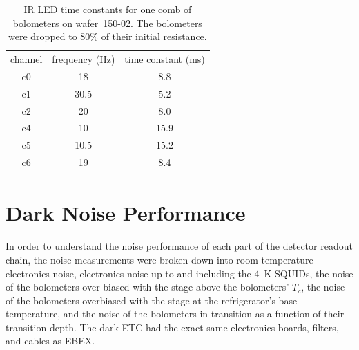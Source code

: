 \begin{table}[htp]
\begin{center}
\begin{tabular}{|c|c|c|}
channel & frequency (Hz) & time constant (ms) \\
c0 & 18 & 8.8 \\
c1 & 30.5 & 5.2 \\
c2 & 20 & 8.0 \\
c4 & 10 & 15.9 \\
c5 & 10.5 & 15.2 \\
c6 & 19 & 8.4 \\
\end{tabular}
\end{center}
\caption{IR LED time constants for one comb of bolometers on wafer~150-02. The bolometers were dropped to 80\% of their initial resistance. 
\label{tab:optical_tau} }
\end{table}









\section{Dark Noise Performance}
\label{sec:dark_noise}

In order to understand the noise performance of each part of the detector readout chain, the noise measurements were broken down into 
room temperature electronics noise, 
electronics noise up to and including the 4~K \ac{SQUID}s, 
the noise of the bolometers over-biased with the stage above the bolometers' $T_{c}$, 
the noise of the bolometers overbiased with the stage at the refrigerator's base temperature, 
and the noise of the bolometers in-transition as a function of their transition depth. 
The dark \ac{ETC} had the exact same electronics boards, filters, and cables as \ac{EBEX}. 


